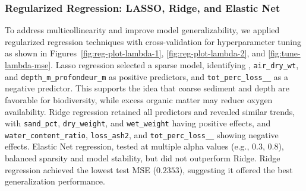 \documentclass[12pt]{article}
\begin{document}
\subsubsection{Regularized Regression: LASSO, Ridge, and Elastic Net}

\qquad To address multicollinearity and improve model generalizability, we
applied regularized regression techniques with cross-validation for
hyperparameter tuning as shown in Figures~\ref{fig:reg-plot-lambda-1},
\ref{fig:reg-plot-lambda-2}, and \ref{fig:tune-lambda-mse}. Lasso regression
selected a sparse model, identifying , \texttt{air\_dry\_wt},
and \texttt{depth\_m\_profondeur\_m} as positive predictors, and
\texttt{tot\_perc\_loss\_\_} as a negative predictor. This supports the idea
that coarse sediment and depth are favorable for biodiversity, while excess
organic matter may reduce oxygen availability. Ridge regression retained all
predictors and revealed similar trends, with \texttt{sand\_pct},
\texttt{dry\_weight}, and \texttt{wet\_weight} having positive effects, and
\texttt{water\_content\_ratio}, \texttt{loss\_ash2}, and
\texttt{tot\_perc\_loss\_\_} showing negative effects. Elastic Net regression,
tested at multiple alpha values (e.g., $0.3$, $0.8$), balanced sparsity and
model stability, but did not outperform Ridge. Ridge regression achieved the
lowest test MSE ($0.2353$), suggesting it offered the best generalization
performance.
\end{document}
